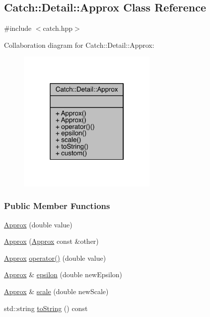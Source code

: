 \hypertarget{a00003}{}\subsection{Catch\+:\+:Detail\+:\+:Approx Class Reference}
\label{a00003}


{\ttfamily \#include $<$catch.\+hpp$>$}



Collaboration diagram for Catch\+:\+:Detail\+:\+:Approx\+:\nopagebreak
\begin{figure}[H]
\begin{center}
\leavevmode
\includegraphics[width=190pt]{a00299}
\end{center}
\end{figure}
\subsubsection*{Public Member Functions}
\begin{DoxyCompactItemize}
\item 
\hyperlink{a00003_a1a8618ea8db08c66bd3d9fe8f74b957a}{Approx} (double value)
\item 
\hyperlink{a00003_a807330c63266fc914abdf6e461255a54}{Approx} (\hyperlink{a00003}{Approx} const \&other)
\item 
\hyperlink{a00003}{Approx} \hyperlink{a00003_a48c9cbc28a05dc9dc8c3973b9eae2268}{operator()} (double value)
\item 
\hyperlink{a00003}{Approx} \& \hyperlink{a00003_a05c50c3ad0a971fab19345b5d94979a9}{epsilon} (double new\+Epsilon)
\item 
\hyperlink{a00003}{Approx} \& \hyperlink{a00003_acd80f0737bf38112beacd5ca95bef113}{scale} (double new\+Scale)
\item 
std\+::string \hyperlink{a00003_adeb74b73506b3f6b2ba72aea15168fbe}{to\+String} () const 
\end{DoxyCompactItemize}
